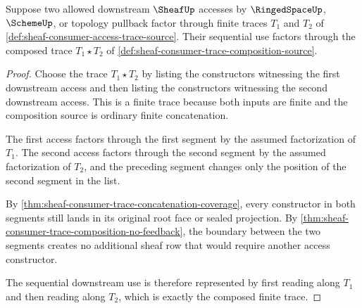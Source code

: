 \begin{theorem}
\label{thm:sheaf-consumer-trace-factorization-composes}
Suppose two allowed downstream $\SheafUp$ accesses by $\RingedSpaceUp$, $\SchemeUp$, or topology pullback factor through finite traces $T_1$ and $T_2$ of \autoref{def:sheaf-consumer-access-trace-source}. Their sequential use factors through the composed trace $T_1 \mathbin{\star} T_2$ of \autoref{def:sheaf-consumer-trace-composition-source}.
\end{theorem}
\begin{proof}
Choose the trace $T_1 \mathbin{\star} T_2$ by listing the constructors witnessing the first downstream access and then listing the constructors witnessing the second downstream access. This is a finite trace because both inputs are finite and the composition source is ordinary finite concatenation.

The first access factors through the first segment by the assumed factorization of $T_1$. The second access factors through the second segment by the assumed factorization of $T_2$, and the preceding segment changes only the position of the second segment in the list.

By \autoref{thm:sheaf-consumer-trace-concatenation-coverage}, every constructor in both segments still lands in its original root face or sealed projection. By \autoref{thm:sheaf-consumer-trace-composition-no-feedback}, the boundary between the two segments creates no additional sheaf row that would require another access constructor.

The sequential downstream use is therefore represented by first reading along $T_1$ and then reading along $T_2$, which is exactly the composed finite trace.
\end{proof}
